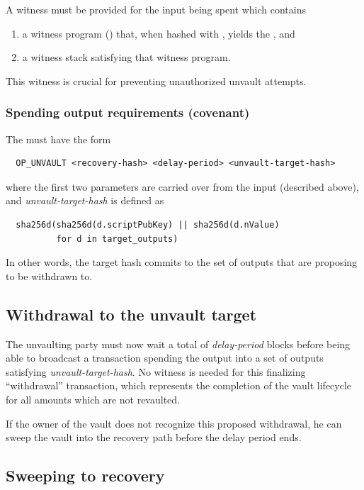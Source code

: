\documentclass[10pt]{article}
\begin{document}
A witness must be provided for the \opv{} input being spent which contains

\begin{enumerate}
  \item a witness program (\spk{}) that, when hashed with , yields the
    , and
  \item a witness stack satisfying that witness program.
\end{enumerate}
This witness is crucial for preventing unauthorized unvault attempts.

\subsubsection*{Spending output requirements (covenant)}

The \opuv{} \spk{} must have the form

\begin{verbatim}
  OP_UNVAULT <recovery-hash> <delay-period> <unvault-target-hash> 
\end{verbatim}

\noindent where the first two parameters are carried over from the input \opv{}
(described above), and
\emph{unvault-target-hash} is defined as

\begin{verbatim}
  sha256d(sha256d(d.scriptPubKey) || sha256d(d.nValue) 
          for d in target_outputs)
\end{verbatim}

In other words, the target hash commits to the set of outputs that are proposing to be
withdrawn to. 

\subsection*{Withdrawal to the unvault target}

The unvaulting party must now wait a total of \emph{delay-period} blocks before being
able to broadcast a transaction spending the \opuv{} output into a set of outputs
satisfying \emph{unvault-target-hash}. No witness is needed for this finalizing
``withdrawal'' transaction, which represents the completion of the vault lifecycle for
all amounts which are not revaulted.

If the owner of the vault does not recognize this proposed
withdrawal, he can sweep the vault into the recovery path before the delay period ends.


\subsection*{Sweeping to recovery}
\end{document}
